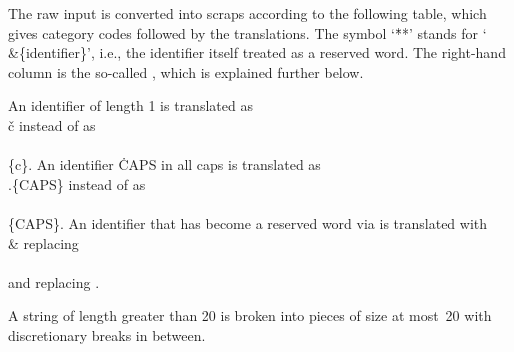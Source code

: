 The raw input is converted into scraps according to the following table,
which gives category codes followed by the translations.
\def\stars {\.{**}}%
The symbol `\stars' stands for `\.{\\\&\{{\rm identifier}\}}',
i.e., the identifier itself treated as a reserved word.
The right-hand column is the so-called , which is explained
further below.

An identifier  of length 1 is translated as \.{\\\v c} instead of
as \.{\\\\\{c\}}. An identifier \.{CAPS} in all caps is translated as
\.{\\.\{CAPS\}} instead of as \.{\\\\\{CAPS\}}. An identifier that has
become a reserved word via  is translated with \.{\\\&}
replacing
\.{\\\\} and  replacing .

A string of length greater than 20 is broken into pieces of size at most~20
with discretionary breaks in between.

